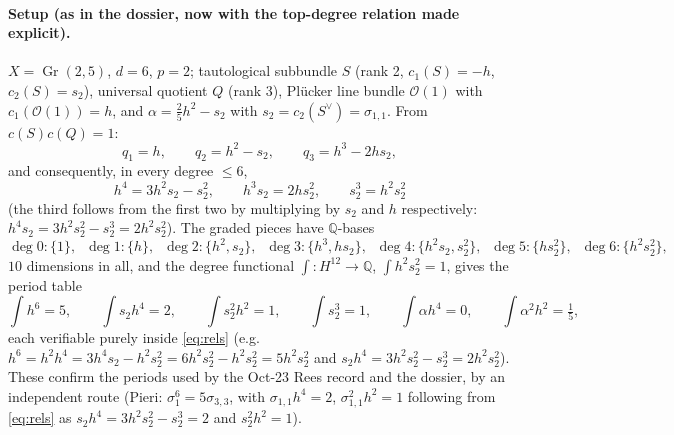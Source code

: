 \documentclass[11pt]{article}
\theoremstyle{definition}
\newcommand{\Gr}{\operatorname{Gr}}
\newcommand{\Oo}{\mathcal O}
\begin{document}
\paragraph{Setup (as in the dossier, now with the top-degree relation
made explicit).}
$X=\Gr(2,5)$, $d=6$, $p=2$; tautological subbundle $S$ (rank 2,
$c_1(S)=-h$, $c_2(S)=s_2$), universal quotient $Q$ (rank 3), Pl\"ucker
line bundle $\Oo(1)$ with $c_1(\Oo(1))=h$, and
$\alpha=\tfrac25 h^2-s_2$ with $s_2=c_2(S^\vee)=\sigma_{1,1}$. From
$c(S)c(Q)=1$:
\[
q_1=h,\qquad q_2=h^2-s_2,\qquad q_3=h^3-2hs_2,
\]
and consequently, in every degree $\le 6$,
\begin{equation}
\boxed{\;h^4=3h^2s_2-s_2^2,\qquad h^3s_2=2hs_2^2,\qquad
s_2^3=h^2s_2^2\;}
\label{eq:rels}
\end{equation}
(the third follows from the first two by multiplying by $s_2$ and $h$
respectively: $h^4s_2=3h^2s_2^2-s_2^3=2h^2s_2^2$).
The graded pieces have $\mathbb Q$-bases
\[
\deg 0:\{1\},\;\; \deg 1:\{h\},\;\;
\deg 2:\{h^2,s_2\},\;\;
\deg 3:\{h^3,hs_2\},\;\;
\deg 4:\{h^2s_2,s_2^2\},\;\;
\deg 5:\{hs_2^2\},\;\;
\deg 6:\{h^2s_2^2\},
\]
$10$ dimensions in all, and the degree functional
$\int:H^{12}\to\mathbb Q$, $\int h^2s_2^2=1$, gives the period table
\begin{equation}
\int h^6=5,\qquad \int s_2h^4=2,\qquad \int s_2^2h^2=1,\qquad
\int s_2^3=1,\qquad \int \alpha h^4=0,\qquad
\int \alpha^2h^2=\tfrac15,
\label{eq:periods}
\end{equation}
each verifiable purely inside \eqref{eq:rels} (e.g.\
$h^6=h^2h^4=3h^4s_2-h^2s_2^2=6h^2s_2^2-h^2s_2^2=5h^2s_2^2$ and
$s_2h^4=3h^2s_2^2-s_2^3=2h^2s_2^2$). These confirm the periods used by
the Oct-23 Rees record and the dossier, by an independent route
(Pieri: $\sigma_1^6=5\sigma_{3,3}$, with $\sigma_{1,1}h^4=2$,
$\sigma_{1,1}^2h^2=1$ following from \eqref{eq:rels} as
$s_2h^4=3h^2s_2^2-s_2^3=2$ and $s_2^2h^2=1$).
\end{document}
